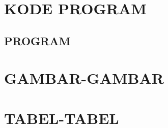\appendix

\chapter{KODE PROGRAM}

\section{PROGRAM}


\chapter{GAMBAR-GAMBAR}



\chapter{TABEL-TABEL}